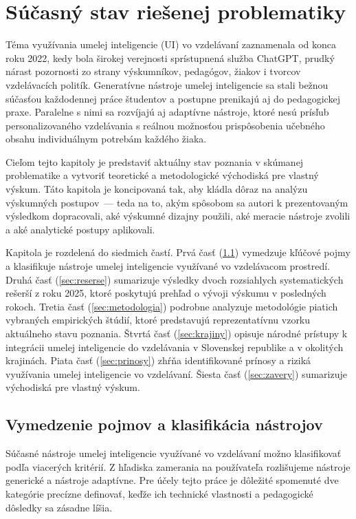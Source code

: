 \chapter{Súčasný stav riešenej problematiky}
\label{chapter:sota}

Téma využívania umelej inteligencie (UI) vo vzdelávaní zaznamenala od konca roku 2022, kedy bola širokej verejnosti sprístupnená služba ChatGPT, prudký nárast pozornosti zo strany výskumníkov, pedagógov, žiakov i tvorcov vzdelávacích politík. Generatívne nástroje umelej inteligencie sa stali bežnou súčasťou každodennej práce študentov a postupne prenikajú aj do pedagogickej praxe. Paralelne s nimi sa rozvíjajú aj adaptívne nástroje, ktoré nesú prísľub personalizovaného vzdelávania s reálnou možnosťou prispôsobenia učebného obsahu individuálnym potrebám každého žiaka.

Cieľom tejto kapitoly je predstaviť aktuálny stav poznania v skúmanej problematike a vytvoriť teoretické a metodologické východiská pre vlastný výskum. Táto kapitola je koncipovaná tak, aby kládla dôraz na analýzu výskumných postupov~--- teda na to, akým spôsobom sa autori k prezentovaným výsledkom dopracovali, aké výskumné dizajny použili, aké meracie nástroje zvolili a aké analytické postupy aplikovali. 

Kapitola je rozdelená do siedmich častí. Prvá časť (\ref{sec:vymedzenie}) vymedzuje kľúčové pojmy a klasifikuje nástroje umelej inteligencie využívané vo vzdelávacom prostredí. Druhá časť (\ref{sec:reserse}) sumarizuje výsledky dvoch rozsiahlych systematických rešerší z roku 2025, ktoré poskytujú prehľad o vývoji výskumu v posledných rokoch. Tretia časť (\ref{sec:metodologia}) podrobne analyzuje metodológie piatich vybraných empirických štúdií, ktoré predstavujú reprezentatívnu vzorku aktuálneho stavu poznania. Štvrtá časť (\ref{sec:krajiny}) opisuje národné prístupy k integrácii umelej inteligencie do vzdelávania v Slovenskej republike a v okolitých krajinách. Piata časť (\ref{sec:prinosy}) zhŕňa identifikované prínosy a riziká využívania umelej inteligencie vo vzdelávaní. Šiesta časť (\ref{sec:zavery}) sumarizuje východiská pre vlastný výskum.


\section{Vymedzenie pojmov a klasifikácia nástrojov}
\label{sec:vymedzenie}

Súčasné nástroje umelej inteligencie využívané vo vzdelávaní možno klasifikovať podľa viacerých kritérií. Z hľadiska zamerania na používateľa rozlišujeme nástroje generické a nástroje adaptívne. Pre účely tejto práce je dôležité spomenuté dve kategórie precízne definovať, keďže ich technické vlastnosti a pedagogické dôsledky sa zásadne líšia.


